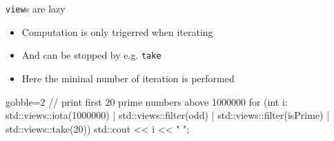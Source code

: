 \begin{frame}[fragile]
  \begin{exampleblock}{\texttt{view}s are lazy}
    \begin{itemize}
    \item Computation is only trigerred when iterating
    \item And can be stopped by e.g. \texttt{take}
    \item Here the mininal number of iteration is performed
    \end{itemize}
    { \scriptsize
      \begin{cppcode*}{gobble=2}
        // print first 20 prime numbers above 1000000
        for (int i: std::views::iota(1000000) | std::views::filter(odd) 
                                              | std::views::filter(isPrime) 
                                              | std::views::take(20)) {
          std::cout << i << " ";  
        }
      \end{cppcode*}
    }
  \end{exampleblock}  
\end{frame}

